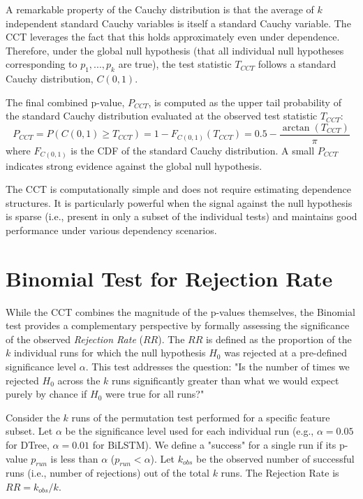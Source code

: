 \begin{appendices}
  A remarkable property of the Cauchy distribution is that the average of $k$ independent standard Cauchy variables is itself a standard Cauchy variable. The CCT leverages the fact that this holds approximately even under dependence. Therefore, under the global null hypothesis (that all individual null hypotheses corresponding to $p_1, ..., p_k$ are true), the test statistic $T_{CCT}$ follows a standard Cauchy distribution, $C(0,1)$.

  The final combined p-value, $P_{CCT}$, is computed as the upper tail probability of the standard Cauchy distribution evaluated at the observed test statistic $T_{CCT}$:
  \begin{equation}
    P_{CCT} = P(C(0,1) \ge T_{CCT}) = 1 - F_{C(0,1)}(T_{CCT}) = 0.5 - \frac{\arctan(T_{CCT})}{\pi}
    \label{eq:cct_pvalue}
  \end{equation}
  where $F_{C(0,1)}$ is the CDF of the standard Cauchy distribution. A small $P_{CCT}$ indicates strong evidence against the global null hypothesis.

  The CCT is computationally simple and does not require estimating dependence structures. It is particularly powerful when the signal against the null hypothesis is sparse (i.e., present in only a subset of the individual tests) and maintains good performance under various dependency scenarios.

  \section{Binomial Test for Rejection Rate}
  \label{sec:binom_test_methodology}

  While the CCT combines the magnitude of the p-values themselves, the Binomial test provides a complementary perspective by formally assessing the significance of the observed \textit{Rejection Rate} ($RR$). The $RR$ is defined as the proportion of the $k$ individual runs for which the null hypothesis $H_0$ was rejected at a pre-defined significance level $\alpha$.
  This test addresses the question: "Is the number of times we rejected $H_0$ across the $k$ runs significantly greater than what we would expect purely by chance if $H_0$ were true for all runs?"

  Consider the $k$ runs of the permutation test performed for a specific feature subset. Let $\alpha$ be the significance level used for each individual run (e.g., $\alpha=0.05$ for DTree, $\alpha=0.01$ for BiLSTM). We define a "success" for a single run if its p-value $p_{run}$ is less than $\alpha$ ($p_{run} < \alpha$). Let $k_{obs}$ be the observed number of successful runs (i.e., number of rejections) out of the total $k$ runs. The Rejection Rate is $RR = k_{obs}/k$.


\end{appendices}
